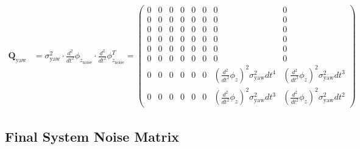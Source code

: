 \documentclass{article}
\begin{document}
\begin{align}
  \textbf{Q}_{\textrm{yaw}} &= \sigma^2_{\textrm{yaw}} \cdot \frac{d^2}{dt^2}\phi_{z_\textrm{noise}} \cdot \frac{d^2}{dt^2}\phi_{z_\textrm{noise}}^T =
\left(\begin{matrix}0 & 0 & 0 & 0 & 0 & 0 & 0 & 0\\0 & 0 & 0 & 0 & 0 & 0 & 0 & 0\\0 & 0 & 0 & 0 & 0 & 0 & 0 & 0\\0 & 0 & 0 & 0 & 0 & 0 & 0 & 0\\0 & 0 & 0 & 0 & 0 & 0 & 0 & 0\\0 & 0 & 0 & 0 & 0 & 0 & 0 & 0\\0 & 0 & 0 & 0 & 0 & 0 & \left(\frac{d^2}{dt^2}\phi_z\right)^{2} \sigma^2_{\textrm{yaw}} dt^{4} & \left(\frac{d^2}{dt^2}\phi_z\right)^{2} \sigma^2_{\textrm{yaw}} dt^{3}\\0 & 0 & 0 & 0 & 0 & 0 & \left(\frac{d^2}{dt^2}\phi_z\right)^{2} \sigma^2_{\textrm{yaw}} dt^{3} & \left(\frac{d^2}{dt^2}\phi_z\right)^{2} \sigma^2_{\textrm{yaw}} dt^{2}\end{matrix}\right)
\end{align}

\subsection{Final System Noise Matrix}
\end{document}
